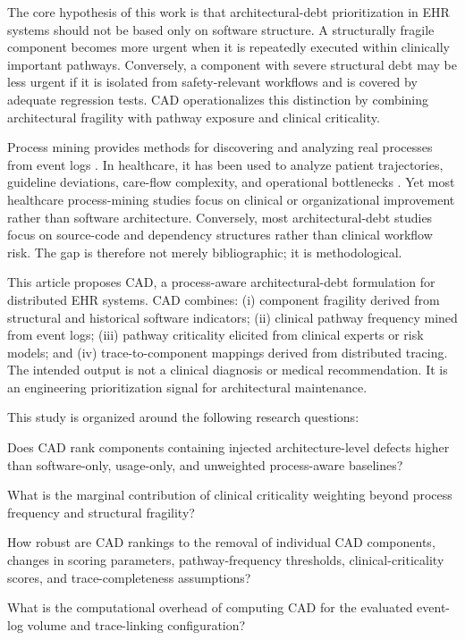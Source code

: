 \documentclass[english,preprint]{elsarticle}
\newcommand{\CAD}{\textsc{CAD}\xspace}
\begin{document}
The core hypothesis of this work is that architectural-debt prioritization in EHR systems should not be based only on software structure. A structurally fragile component becomes more urgent when it is repeatedly executed within clinically important pathways. Conversely, a component with severe structural debt may be less urgent if it is isolated from safety-relevant workflows and is covered by adequate regression tests. \CAD operationalizes this distinction by combining architectural fragility with pathway exposure and clinical criticality.

Process mining provides methods for discovering and analyzing real processes from event logs \cite{VanderAalst2016Book,VanderAalst2012Manifesto}. In healthcare, it has been used to analyze patient trajectories, guideline deviations, care-flow complexity, and operational bottlenecks \cite{Rojas2016Healthcare,MunozGama2022Healthcare,DeRoock2022Perspective}. Yet most healthcare process-mining studies focus on clinical or organizational improvement rather than software architecture. Conversely, most architectural-debt studies focus on source-code and dependency structures rather than clinical workflow risk. The gap is therefore not merely bibliographic; it is methodological.

This article proposes \CAD, a process-aware architectural-debt formulation for distributed EHR systems. \CAD combines: (i) component fragility derived from structural and historical software indicators; (ii) clinical pathway frequency mined from event logs; (iii) pathway criticality elicited from clinical experts or risk models; and (iv) trace-to-component mappings derived from distributed tracing. The intended output is not a clinical diagnosis or medical recommendation. It is an engineering prioritization signal for architectural maintenance.

This study is organized around the following research questions:
\begin{description}[style=nextline,leftmargin=1.2cm,labelwidth=1cm]
  \item[\textbf{RQ1}] Does \CAD rank components containing injected architecture-level defects higher than software-only, usage-only, and unweighted process-aware baselines?
  \item[\textbf{RQ2}] What is the marginal contribution of clinical criticality weighting beyond process frequency and structural fragility?
  \item[\textbf{RQ3}] How robust are \CAD rankings to the removal of individual \CAD components, changes in scoring parameters, pathway-frequency thresholds, clinical-criticality scores, and trace-completeness assumptions?
  \item[\textbf{RQ4}] What is the computational overhead of computing \CAD for the evaluated event-log volume and trace-linking configuration?
\end{description}
\end{document}
